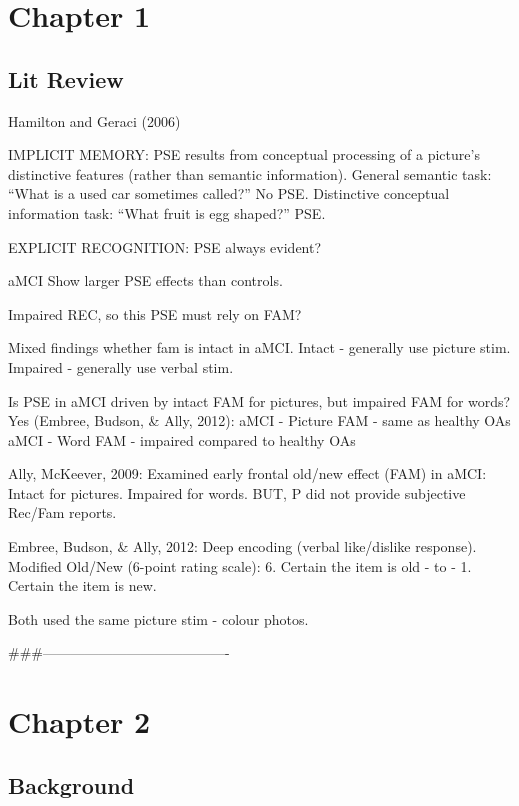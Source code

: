 \documentclass[
  11pt,
]{article}
\begin{document}
\newpage

\hypertarget{chapter-1}{%
\section{Chapter 1}\label{chapter-1}}

\hypertarget{lit-review}{%
\subsection{Lit Review}\label{lit-review}}

Hamilton and Geraci (2006)

IMPLICIT MEMORY: PSE results from conceptual processing of a picture's
distinctive features (rather than semantic information). General
semantic task: ``What is a used car sometimes called?'' No PSE.
Distinctive conceptual information task: ``What fruit is egg shaped?''
PSE.

EXPLICIT RECOGNITION: PSE always evident?

aMCI Show larger PSE effects than controls.

Impaired REC, so this PSE must rely on FAM?

Mixed findings whether fam is intact in aMCI. Intact - generally use
picture stim. Impaired - generally use verbal stim.

Is PSE in aMCI driven by intact FAM for pictures, but impaired FAM for
words? Yes (Embree, Budson, \& Ally, 2012): aMCI - Picture FAM - same as
healthy OAs aMCI - Word FAM - impaired compared to healthy OAs

Ally, McKeever, 2009: Examined early frontal old/new effect (FAM) in
aMCI: Intact for pictures. Impaired for words. BUT, P did not provide
subjective Rec/Fam reports.

Embree, Budson, \& Ally, 2012: Deep encoding (verbal like/dislike
response). Modified Old/New (6-point rating scale): 6. Certain the item
is old - to - 1. Certain the item is new.

Both used the same picture stim - colour photos.

\#\#\#----------------------------------------

\newpage

\hypertarget{chapter-2}{%
\section{Chapter 2}\label{chapter-2}}

\hypertarget{background}{%
\subsection{Background}\label{background}}
\end{document}
